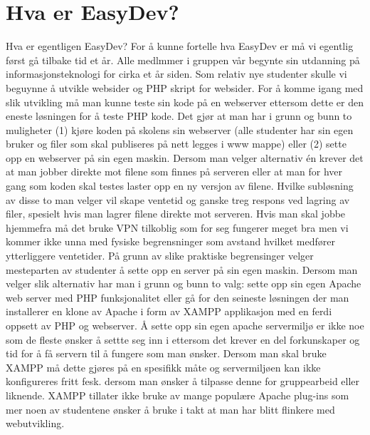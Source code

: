 \chapter{Hva er EasyDev?}

\lettrine[lines=2]{H}{}va er egentligen EasyDev? For å kunne fortelle hva EasyDev er må vi egentlig først gå tilbake tid et år. Alle medlmmer i gruppen vår begynte sin utdanning på informasjonsteknologi for cirka et år siden. Som relativ nye studenter skulle vi beguynne å utvikle websider og PHP skript for websider. For å komme igang med slik utvikling må man kunne teste sin kode på en webserver ettersom dette er den eneste løsningen for å teste PHP kode. Det gjør at man har i grunn og bunn to muligheter (1) kjøre koden på skolens sin webserver (alle studenter har sin egen bruker og filer som skal publiseres på nett legges i www mappe) eller (2) sette opp en webserver på sin egen maskin. Dersom man velger alternativ én krever det at man jobber direkte mot filene som finnes på serveren eller at man for hver gang som koden skal testes laster opp en ny versjon av filene. Hvilke subløsning av disse to man velger vil skape ventetid og ganske treg respons ved lagring av filer, spesielt hvis man lagrer filene direkte mot serveren. Hvis man skal jobbe hjemmefra må det bruke VPN tilkoblig som for seg fungerer meget bra men vi kommer ikke unna med fysiske begrensninger som avstand hvilket medfører ytterliggere ventetider. 
På grunn av slike praktiske begrensinger velger mesteparten av studenter å sette opp en server på sin egen maskin. Dersom man velger slik alternativ har man i grunn og bunn to valg: sette opp sin egen Apache web server med PHP funksjonalitet eller gå for den seineste løsningen der man installerer en klone av Apache i form av XAMPP applikasjon med en ferdi oppsett av PHP og webserver. Å sette opp sin egen apache servermiljø er ikke noe som de fleste ønsker å settte seg inn i ettersom det krever en del forkunskaper og tid for å få servern til å fungere som man ønsker. Dersom man skal bruke XAMPP må dette gjøres på en spesifikk måte og servermiljøen kan ikke konfigureres fritt fesk. dersom man ønsker å tilpasse denne for gruppearbeid eller liknende. XAMPP tillater ikke bruke av mange populære Apache plug-ins som mer noen av studentene ønsker å bruke i takt at man har blitt flinkere med webutvikling.

